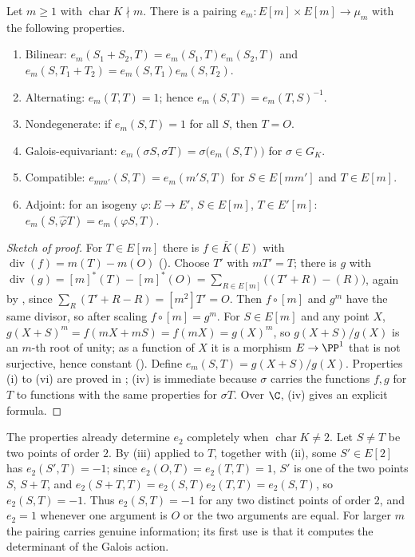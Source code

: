 \begin{theorem}\label{thm:ellcurves:weil}
Let $m\ge1$ with $\operatorname{char}K\nmid m$. There is a pairing $e_m\colon E[m]\times E[m]\to\mu_m$ with the following properties.
\begin{enumerate}[label=(\roman*)]
\item Bilinear: $e_m(S_1+S_2,T)=e_m(S_1,T)e_m(S_2,T)$ and $e_m(S,T_1+T_2)=e_m(S,T_1)e_m(S,T_2)$.
\item Alternating: $e_m(T,T)=1$; hence $e_m(S,T)=e_m(T,S)^{-1}$.
\item Nondegenerate: if $e_m(S,T)=1$ for all $S$, then $T=O$.
\item Galois-equivariant: $e_m(\sigma S,\sigma T)=\sigma\bigl(e_m(S,T)\bigr)$ for $\sigma\in G_K$.
\item Compatible: $e_{mm'}(S,T)=e_m(m'S,T)$ for $S\in E[mm']$ and $T\in E[m]$.
\item Adjoint: for an isogeny $\varphi\colon E\to E'$, $S\in E[m]$, $T\in E'[m]$: $e_m(S,\hat\varphi T)=e_m(\varphi S,T)$.
\end{enumerate}
\end{theorem}

\begin{proof}[Sketch of proof]
For $T\in E[m]$ there is $f\in\bar K(E)$ with $\operatorname{div}(f)=m(T)-m(O)$ (). Choose $T'$ with $mT'=T$; there is $g$ with
$\operatorname{div}(g)=[m]^*(T)-[m]^*(O)=\sum_{R\in E[m]}\bigl((T'+R)-(R)\bigr)$, again by , since $\sum_R(T'+R-R)=[m^2]T'=O$. Then $f\circ[m]$ and $g^m$ have
the same divisor, so after scaling $f\circ[m]=g^m$. For $S\in E[m]$ and any point $X$, $g(X+S)^m=f(mX+mS)=f(mX)=g(X)^m$, so $g(X+S)/g(X)$ is an $m$-th root of unity; as a
function of $X$ it is a morphism $E\to\PP^1$ that is not surjective, hence constant (). Define $e_m(S,T)=g(X+S)/g(X)$. Properties (i) to (vi) are
proved in \cite[Section III.8]{SilvermanAEC}; (iv) is immediate because $\sigma$ carries the functions $f,g$ for $T$ to functions with the same properties for $\sigma T$.
Over $\C$, (iv) gives an explicit formula.
\end{proof}

The properties already determine $e_2$ completely when $\operatorname{char}K\ne2$. Let $S\ne T$ be two points of order $2$. By (iii) applied to $T$, together with (ii),
some $S'\in E[2]$ has $e_2(S',T)=-1$; since $e_2(O,T)=e_2(T,T)=1$, $S'$ is one of the two points $S$, $S+T$, and $e_2(S+T,T)=e_2(S,T)e_2(T,T)=e_2(S,T)$, so
$e_2(S,T)=-1$. Thus $e_2(S,T)=-1$ for any two distinct points of order $2$, and $e_2=1$ whenever one argument is $O$ or the two arguments are equal. For larger $m$
the pairing carries genuine information; its first use is that it computes the determinant of the Galois action.

